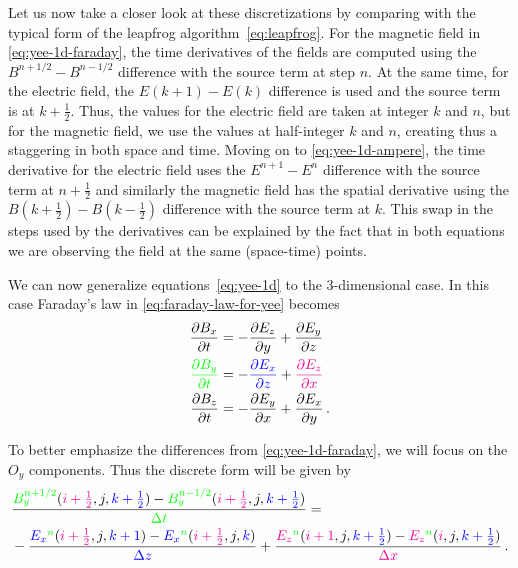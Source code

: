 \documentclass[12pt, class=report, crop=false]{standalone}
\begin{document}
Let us now take a closer look at these discretizations by comparing with the typical form of the leapfrog
algorithm~\eqref{eq:leapfrog}.
For the magnetic field in \cref{eq:yee-1d-faraday}, the time derivatives of the fields are
computed using the \(B^{n+1/2} - B^{n-1/2}\) difference with the source term at step \(n\).
At the same time, for the electric field, the \(E(k+1)-E(k)\) difference is used and the source
term is at \(k+\frac{1}{2}\). Thus, the values for the electric
field are taken at integer \(k\) and \(n\), but for the magnetic
field, we use the values at half-integer \(k\) and \(n\), creating
thus a staggering in both space and time. Moving on to  \cref{eq:yee-1d-ampere},
the time derivative for the electric field uses the \(E^{n+1}-E^n\)
difference with the source term at \(n+\frac{1}{2}\) and similarly
the magnetic field has the spatial derivative using the \(B(k+\frac{1}{2}) - B(k-\frac{1}{2})\) difference with the source
term at \(k\). This swap in the steps used by the derivatives can
be explained by the fact that in both equations we are observing
the field at the same (space-time) points.

We can now generalize equations~\eqref{eq:yee-1d} to the 3-dimensional case.
In this case Faraday's law in \cref{eq:faraday-law-for-yee} becomes
\begin{align*}
  \pdv{B_x}{t} &= -\pdv{E_z}{y} + \pdv{E_y}{z} \\
  \mathcolor{green}{\pdv{B_y}{t}} &= -\mathcolor{blue}{\pdv{E_x}{z}} + \mathcolor{magenta}{\pdv{E_z}{x}} \\
  \pdv{B_z}{t} &= -\pdv{E_y}{x} + \pdv{E_x}{y} \,.
\end{align*}

To better emphasize the differences from \cref{eq:yee-1d-faraday}, we will focus on the
\(O_y\) components. Thus the discrete form will be given by
\begin{equation}
  \label{eq:yee-3d-faraday-y}
  \begin{aligned}
    &\frac{\mathcolor{green}{B_y^{n+1/2}}(\mathcolor{magenta}{i+\frac{1}{2}},j,\mathcolor{blue}{k+\frac{1}{2}})
    - \mathcolor{green}{B_y^{n-1/2}}(\mathcolor{magenta}{i+\frac{1}{2}},j,\mathcolor{blue}{k+\frac{1}{2}})}{\mathcolor{green}{\Delta t}} = \\
    &- \frac{\mathcolor{blue}{E_x}^{\mathcolor{green}{n}}(\mathcolor{magenta}{i+\frac{1}{2}},j,\mathcolor{blue}{k+1}) -
      \mathcolor{blue}{E_x}^{\mathcolor{green}{n}}(\mathcolor{magenta}{i+\frac{1}{2}},j,\mathcolor{blue}{k})}{\mathcolor{blue}{\Delta z}}
    + \frac{\mathcolor{magenta}{E_z}^{\mathcolor{green}{n}}(\mathcolor{magenta}{i+1},j,\mathcolor{blue}{k+\frac{1}{2}}) -
      \mathcolor{magenta}{E_z}^{\mathcolor{green}{n}}(\mathcolor{magenta}{i},j,\mathcolor{blue}{k+\frac{1}{2}})}{\mathcolor{magenta}{\Delta x}}\,.
  \end{aligned}
\end{equation}
\end{document}
